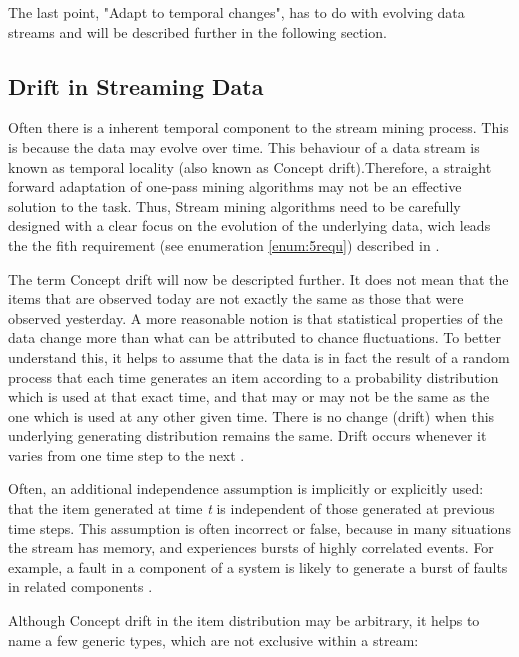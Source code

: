 \documentclass[12pt,oneside,a4paper,parskip]{scrbook}
\begin{document}
The last point, "Adapt to temporal changes", has to do with evolving data streams and will be described further in the following 
section.

\subsection{Drift in Streaming Data}
Often there is a inherent temporal component to the stream mining process. This is because the data may evolve over time. 
This behaviour of a data stream is known as temporal locality\cite{aggarwal2007data} (also known as Concept drift)\cite{MLonDataStreams}.Therefore, 
a straight forward adaptation of one-pass mining algorithms may not be an effective solution to the task.
Thus, Stream mining algorithms need to be carefully designed with a clear focus on the evolution of the underlying data, 
wich leads the the fith requirement (see enumeration \ref{enum:5requ}) described in \cite{MLonDataStreams}.

The term Concept drift will now be descripted further.
It does not mean that the items that are observed today are not exactly the same as those that were observed yesterday. 
A more reasonable notion is that statistical properties of the data change more than what can be attributed to chance
fluctuations. To better understand this, it helps to assume that the data is in fact the result of a random process that
each time generates an item according to a probability distribution which is used at that exact time, and that may or 
may not be the same as the one which is used at any other given time. There is no change (drift) when this underlying generating distribution
remains the same. Drift occurs whenever it varies from one time step to the next \cite{MLonDataStreams}.

Often, an additional independence assumption is implicitly or explicitly used: that the item generated at time \textit{t} is 
independent of those generated at previous time steps. This assumption is often incorrect or false, because in many 
situations the stream has memory, and experiences bursts of highly correlated events. For example, a fault in a 
component of a system is likely to generate a burst of faults in related components \cite{MLonDataStreams}. 

Although Concept drift in the item distribution may be arbitrary, it helps to name a few generic types, 
which are not exclusive within a stream:
\end{document}

